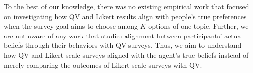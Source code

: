 To the best of our knowledge, there was no existing empirical work that focused on investigating how QV and Likert results align with people’s true preferences when the survey goal aims to choose among $K$ options of one topic. Further, we are not aware of any work that studies alignment between participants' actual beliefs through their behaviors with QV surveys. Thus, we aim to understand how QV and Likert scale surveys aligned with the agent's true beliefs instead of merely comparing the outcomes of Likert scale surveys with QV. 























